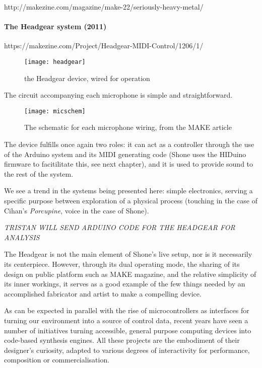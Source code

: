 http://makezine.com/magazine/make-22/seriously-heavy-metal/

\paragraph{The Headgear system (2011)}

https://makezine.com/Project/Headgear-MIDI-Control/1206/1/

	\begin{figure}[h!]
	  \caption{the Headgear device, wired for operation}
	  \centering
	    \texttt{[image: headgear]}
	\end{figure}
	
The circuit accompanying each microphone is simple and straightforward.  

		\begin{figure}[h!]
		  \caption{The schematic for each microphone wiring, from the MAKE article}
		  \centering
		    \texttt{[image: micschem]}
		\end{figure}
		
		The device fulfills once again two roles: it can act as a controller through the use of the Arduino system and its MIDI generating code (Shone uses the HIDuino firmware to facitilitate this, see next chapter), and it is used to provide sound to the rest of the system. 
	
	We see a trend in the systems being presented here: simple electronics, serving a specific purpose between exploration of a physical process (touching in the case of Cihan's \emph{Porcupine}, voice in the case of Shone).

	\emph{TRISTAN WILL SEND ARDUINO CODE FOR THE HEADGEAR FOR ANALYSIS}
	
The Headgear is not the main element of Shone's live setup, nor is it necessarily its centerpiece. However, through its dual operating mode, the sharing of its design on public platform such as MAKE magazine, and the relative simplicity of its inner workings, it serves as a good example of the few things needed by an accomplished fabricator and artist to make a compelling device. 

As can be expected in parallel with the rise of microcontrollers as interfaces for turning our environment into a source of control data, recent years have seen a number of initiatives turning accessible, general purpose computing devices into code-based synthesis engines. All these projects are the embodiment of their designer's curiosity, adapted to various degrees of interactivity for performance, composition or commercialisation. 

